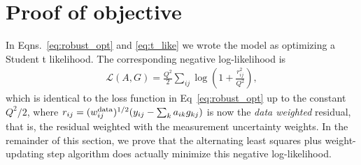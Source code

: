 \documentclass[onecolumn,floatfix]{aastex631}
\begin{document}






\section{Proof of objective} \label{sec:proof}


In Eqns.~\eqref{eq:robust_opt} and \eqref{eq:t_like} we wrote the model as optimizing a Student t likelihood.
The corresponding negative log-likelihood is
\begin{align}
    \mathcal{L}(A,G) = \frac{Q^2}{2} \sum_{ij} \log\left(1 + \frac{r_{ij}^2}{Q^2}\right), \label{eq:t_loss}
\end{align}
which is identical to the loss function in Eq~\eqref{eq:robust_opt} up to the constant $Q^2 / 2$, where $r_{ij} = (w_{ij}^{\rm data})^{1/2} (y_{ij} - \sum_{k} a_{ik} g_{kj})$ is now the \emph{data weighted} residual, that is, the residual weighted with the measurement uncertainty weights.
In the remainder of this section, we prove that the alternating least squares plus weight-updating step algorithm does actually minimize this negative log-likelihood.
\end{document}
